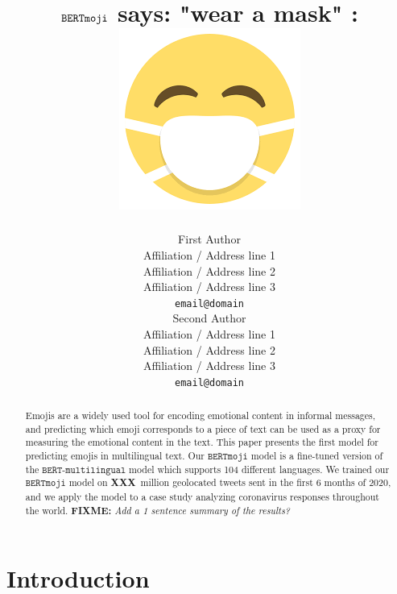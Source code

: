 \documentclass[11pt]{article}
\title{$\bertmoji$ says: "wear a mask" :  \includegraphics[scale=0.07]{images/mask_photo.png}}
\author{First Author \\
  Affiliation / Address line 1 \\
  Affiliation / Address line 2 \\
  Affiliation / Address line 3 \\
  {\tt email@domain} \\\And
  Second Author \\
  Affiliation / Address line 1 \\
  Affiliation / Address line 2 \\
  Affiliation / Address line 3 \\
  {\tt email@domain} \\}
\date{}
\newcommand{\fixme}[1]{{\color{red} \textbf{FIXME:} {\textit {#1}}}}
\newcommand{\XXX}{\textbf{XXX}~}
\newcommand{\bertmoji}{\texttt{BERTmoji}}
\newcommand{\bert}{\texttt{BERT-multilingual}}
\begin{document}
\maketitle
\begin{abstract}
    Emojis are a widely used tool for encoding emotional content in informal messages,
    and predicting which emoji corresponds to a piece of text can be used as a proxy for measuring the emotional content in the text.
    This paper presents the first model for predicting emojis in multilingual text.
    Our $\bertmoji$ model is a fine-tuned version of the $\bert$ model which supports 104 different languages.
    We trained our $\bertmoji$ model on \XXX million geolocated tweets sent in the first 6 months of 2020,
    and we apply the model to a case study analyzing coronavirus responses throughout the world.
    \fixme{Add a 1 sentence summary of the results?}
\end{abstract}

%
% 





\section{Introduction}
\label{sec:intro}
\end{document}

